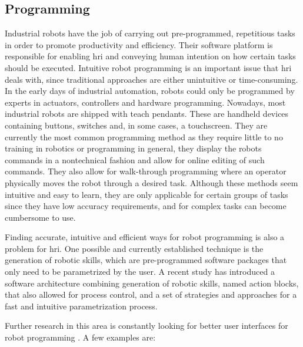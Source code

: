\subsection{Programming}

\par Industrial robots have the job of carrying out pre-programmed, repetitious tasks in order to promote productivity and efficiency. Their software platform is responsible for enabling \ac{hri} and conveying human intention on how certain tasks should be executed. Intuitive robot programming is an important issue that \ac{hri} deals with, since traditional approaches are either unintuitive or time-consuming. In the early days of industrial automation, robots could only be programmed by experts in actuators, controllers and hardware programming.
Nowadays, most industrial robots are shipped with teach pendants. These are handheld devices containing buttons, switches and, in some cases, a touchscreen. They are currently the most common programming method as they require little to no training in robotics or programming in general, they display the robots commands in a nontechnical fashion and allow for online editing of such commands. They also allow for walk-through programming where an operator physically moves the robot through a desired task. Although these methods seem intuitive and easy to learn, they are only applicable for certain groups of tasks since they have low accuracy requirements, and for complex tasks can become cumbersome to use.
\par Finding accurate, intuitive and efficient ways for robot programming is also a problem for \ac{hri}. One possible and currently established technique is the generation of robotic skills, which are pre-programmed software packages that only need to be parametrized by the user. A recent study \cite{cobot.skill} has introduced a software architecture combining generation of robotic skills, named action blocks, that also allowed for process control, and a set of strategies and approaches for a fast and intuitive parametrization process.
\par Further research in this area is constantly looking for better user interfaces for robot programming \cite{paper.review.1, cobot.reality}. A few examples are:

